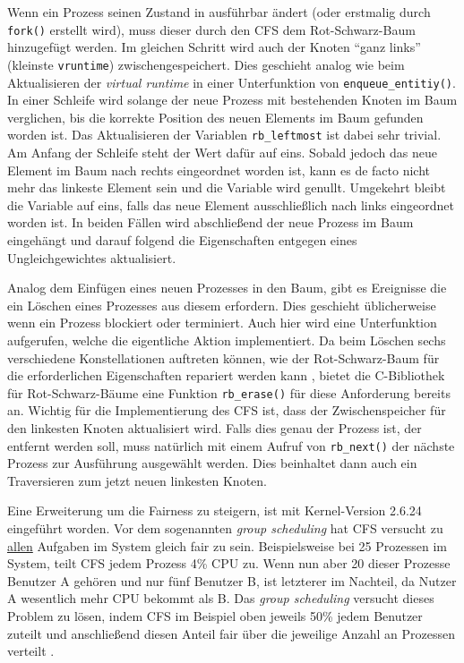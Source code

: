 Wenn ein Prozess seinen Zustand in ausführbar ändert (oder erstmalig durch \texttt{fork()} erstellt wird), muss dieser durch den CFS dem Rot-Schwarz-Baum hinzugefügt werden. Im gleichen Schritt wird auch der Knoten ``ganz links'' (kleinste \texttt{vruntime}) zwischengespeichert. Dies geschieht analog wie beim Aktualisieren der \textit{virtual runtime} in einer Unterfunktion von \texttt{enqueue\_entitiy()}. In einer Schleife wird solange der neue Prozess mit bestehenden Knoten im Baum verglichen, bis die korrekte Position des neuen Elements im Baum gefunden worden ist. Das Aktualisieren der Variablen \texttt{rb\_leftmost} ist dabei sehr trivial. Am Anfang der Schleife steht der Wert dafür auf eins. Sobald jedoch das neue Element im Baum nach rechts eingeordnet worden ist, kann es de facto nicht mehr das linkeste Element sein und die Variable wird genullt. Umgekehrt bleibt die Variable auf eins, falls das neue Element ausschließlich nach links eingeordnet worden ist. 
In beiden Fällen wird abschließend der neue Prozess im Baum eingehängt und darauf folgend die Eigenschaften entgegen eines Ungleichgewichtes aktualisiert.

Analog dem Einfügen eines neuen Prozesses in den Baum, gibt es Ereignisse die ein Löschen eines Prozesses aus diesem erfordern. Dies geschieht üblicherweise wenn ein Prozess blockiert oder terminiert. Auch hier wird eine Unterfunktion aufgerufen, welche die eigentliche Aktion implementiert.
Da beim Löschen sechs verschiedene Konstellationen auftreten können, wie der Rot-Schwarz-Baum für die erforderlichen Eigenschaften repariert werden kann \cite{tcormen}, bietet die C-Bibliothek für Rot-Schwarz-Bäume eine Funktion  \texttt{rb\_erase()} für diese Anforderung bereits an. Wichtig für die Implementierung des CFS ist, dass der Zwischenspeicher für den linkesten Knoten aktualisiert wird. Falls dies genau der Prozess ist, der entfernt werden soll, muss natür\-lich mit einem Aufruf von \texttt{rb\-\_next()} der näch\-ste Prozess zur Ausführung ausgewählt werden. Dies beinhaltet dann auch ein Traversieren zum jetzt neuen linkesten Knoten.


Eine Erweiterung um die Fairness zu steigern, ist mit Ker\-nel-Version 2.6.24 eingeführt worden. Vor dem sogenannten \textit{group scheduling} hat CFS versucht zu \underline{allen} Aufgaben im System gleich fair zu sein. Beispielsweise bei 25 Prozessen im System, teilt CFS jedem Prozess 4\% CPU zu. Wenn nun aber 20 dieser Prozesse Benutzer A gehören und nur fünf Benutzer B, ist letzterer im Nachteil, da Nutzer A wesentlich mehr CPU bekommt als B. Das \textit{group scheduling} versucht dieses Problem zu lösen, indem CFS im Beispiel oben jeweils 50\% jedem Benutzer zuteilt und anschließend diesen Anteil fair über die jeweilige Anzahl an Prozessen verteilt \cite{cpabla}. 
